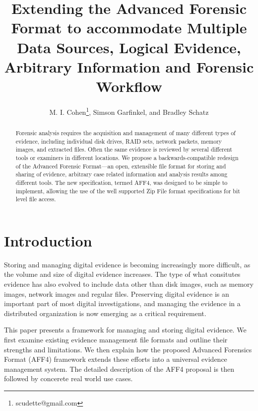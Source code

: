 \documentclass[10pt, conference]{IEEEtran}
\begin{document}
\title{Extending the Advanced Forensic Format to accommodate Multiple
  Data Sources, Logical Evidence, Arbitrary Information and Forensic Workflow}
\author{M. I. Cohen\footnote{scudette@gmail.com}, Simson Garfinkel, and Bradley Schatz}
\maketitle

\begin{abstract}
Forensic analysis requires the acquisition and management of many
different types of evidence, including individual disk drives, RAID
sets, network packets, memory images, and extracted files. Often the
same evidence is reviewed by several different tools or examiners in
different locations. We propose a backwards-compatible redesign of the
Advanced Forensic Format---an open, extensible file format for storing
and sharing of evidence, arbitrary case related information and
analysis results among different tools. The new specification, termed
AFF4, was designed to be simple to implement, allowing the use of the
well supported Zip File format specifications for bit level file
access.
\end{abstract}

\section{Introduction}
Storing and managing digital evidence is becoming increasingly more
difficult, as the volume and size of digital evidence increases. The
type of what consitutes evidence has also evolved to include data
other than disk images, such as memory images, network images and
regular files. Preserving digital evidence is an important part of
most digital investigations\cite{carrier:event-based}, and managing
the evidence in a distributed organization is now emerging as a
critical requirement.

This paper presents a framework for managing and storing digital
evidence. We first examine existing evidence management file formats
and outline their strengths and limitations. We then explain how the
proposed Advanced Forensics Format (AFF4) framework extends these
efforts into a universal evidence management system. The detailed
description of the AFF4 proposal is then followed by concerete real
world use cases.
\end{document}
